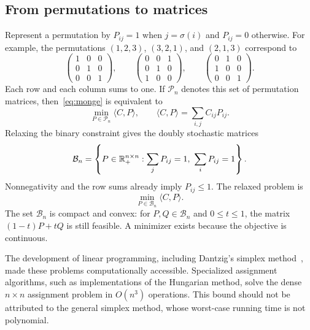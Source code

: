 \subsection{From permutations to matrices}
Represent a permutation by $P_{ij}=1$ when $j=\sigma(i)$ and $P_{ij}=0$ otherwise. For example, the permutations $(1,2,3)$, $(3,2,1)$, and $(2,1,3)$ correspond to
\[
 \begin{pmatrix}1&0&0\\0&1&0\\0&0&1\end{pmatrix},\qquad
 \begin{pmatrix}0&0&1\\0&1&0\\1&0&0\end{pmatrix},\qquad
 \begin{pmatrix}0&1&0\\1&0&0\\0&0&1\end{pmatrix}.
\]
Each row and each column sums to one. If $\mathcal P_n$ denotes this set of permutation matrices, then~\eqref{eq:monge} is equivalent to
\begin{equation}\label{eq:mongematrix}
 \min_{P\in\mathcal P_n}\langle C,P\rangle,
 \qquad \langle C,P\rangle=\sum_{i,j}C_{ij}P_{ij}.
\end{equation}
Relaxing the binary constraint gives the doubly stochastic matrices
\begin{equation}\label{eq:bistoch}
 \mathcal B_n=\left\{P\in\RR_+^{n\times n}:\sum_jP_{ij}=1,\ \sum_iP_{ij}=1\right\}.
\end{equation}
Nonnegativity and the row sums already imply $P_{ij}\le1$. The relaxed problem is
\begin{equation}\label{eq:kantoassign}
 \min_{P\in\mathcal B_n}\langle C,P\rangle.
\end{equation}
The set $\mathcal B_n$ is compact and convex: for $P,Q\in\mathcal B_n$ and $0\le t\le1$, the matrix $(1-t)P+tQ$ is still feasible. A minimizer exists because the objective is continuous.

The development of linear programming, including Dantzig's simplex method~\cite{Dantzig51}, made these problems computationally accessible. Specialized assignment algorithms, such as implementations of the Hungarian method, solve the dense $n\times n$ assignment problem in $O(n^3)$ operations. This bound should not be attributed to the general simplex method, whose worst-case running time is not polynomial.

